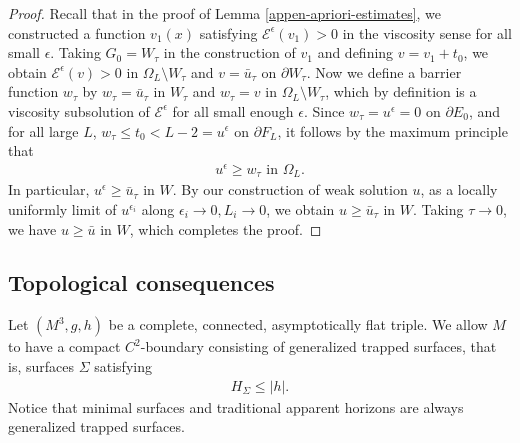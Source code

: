 \documentclass[11pt, letterpaper]{amsart}
\theoremstyle{definition}
\theoremstyle{remark}
\begin{document}
\begin{proof}
Recall that in the proof of Lemma \ref{appen-apriori-estimates}, we constructed a function $v_1(x)$ satisfying $\mathcal{E} ^{\epsilon }(v_1) > 0 $ in the viscosity sense for all small $\epsilon $. Taking $G_0 = W_{\tau } $ in the construction of $v_1$ and defining $v= v_1 + t_0$, we obtain $\mathcal{E}^{\epsilon }(v) >0$ in $\Omega _{L} \setminus W_\tau $ and $v= \bar{u}_{\tau }$ on $\partial W_\tau  $. 
	Now we define a barrier function $w_\tau $ by $w_\tau  = \bar{u}_{\tau }  $ in $W_{\tau }$ and $w_\tau  = v $ in $\Omega _{L} \setminus W_\tau $, which by definition is a viscosity subsolution of $\mathcal{E}^{\epsilon }$ for all small enough $\epsilon $. Since $w_{\tau } = u ^{\epsilon } =0$ on $\partial E_0$, and for all large $L$, $w_\tau  \leq t_0 < L-2 = u ^{\epsilon }$ on $\partial F_L$, it follows by the maximum principle that
	\begin{align*}
		u ^{\epsilon } \geq w_{\tau } \text{ in } \Omega _{L}.
	\end{align*} 
In particular, $u ^{\epsilon } \geq \bar{u}_{\tau }$ in $W$. By our construction of weak solution $u$, as a locally uniformly limit of $u ^{\epsilon _i}$ along $\epsilon _i\to 0, L_i \to 0$, we obtain $u \geq \bar{u}_{\tau }$ in $W$. Taking $\tau \to 0$, we have $u \geq \bar{u}$ in $W$, which completes the proof. 
\end{proof}





\subsection{Topological consequences}
Let $(M^3, g, h)$ be a complete, connected, asymptotically flat triple. We allow $M$ to have a compact $C^2$-boundary consisting of generalized trapped surfaces, that is, surfaces $\Sigma $ satisfying
\begin{align*}
	H_{\Sigma } \leq |h|.
\end{align*} 
Notice that minimal surfaces and traditional apparent horizons are always generalized trapped surfaces. 
\end{document}
